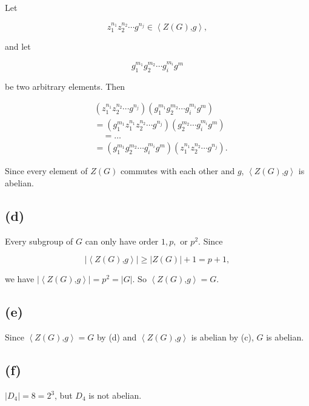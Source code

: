 Let

\[z_{1}^{n_{1}}z_{2}^{n_{2}}\cdots g^{n_{j}} \in \left\langle {Z(G)\text{,}g} \right\rangle,\]

and let

\[g_{1}^{m_{1}}g_{2}^{m_{2}}\cdots g_{i}^{m_{i}}g^{m}\]

be two arbitrary elements. Then

\[\begin{matrix}
 & {\left( {z_{1}^{n_{1}}z_{2}^{n_{2}}\cdots g^{n_{j}}} \right)\left( {g_{1}^{m_{1}}g_{2}^{m_{2}}\cdots g_{i}^{m_{i}}g^{m}} \right)} \\
 & {= \left( {g_{1}^{m_{1}}z_{1}^{n_{1}}z_{2}^{n_{2}}\cdots g^{n_{j}}} \right)\left( {g_{2}^{m_{2}}\cdots g_{i}^{m_{i}}g^{m}} \right)} \\
 & {\quad = \ldots} \\
 & {= \left( {g_{1}^{m_{1}}g_{2}^{m_{2}}\cdots g_{i}^{m_{i}}g^{m}} \right)\left( {z_{1}^{n_{1}}z_{2}^{n_{2}}\cdots g^{n_{j}}} \right).}
\end{matrix}\]

Since every element of \(Z(G)\) commutes with each other and \(g\), \(\left\langle {Z(G)\text{,}g} \right\rangle\) is abelian.

\subsection{(d)}

Every subgroup of \(G\) can only have order \(1,p,\) or \(p^{2}\). Since

\[\left| \left\langle {Z(G)\text{,}g} \right\rangle \right| \geq \left| {Z(G)} \right| + 1 = p + 1,\]

we have \(\left| \left\langle {Z(G)\text{,}g} \right\rangle \right| = p^{2} = |G|\). So \(\left\langle {Z(G)\text{,}g} \right\rangle = G\).

\subsection{(e)}

Since \(\left\langle {Z(G)\text{,}g} \right\rangle = G\) by (d) and \(\left\langle {Z(G)\text{,}g} \right\rangle\) is abelian by (c), \(G\) is abelian.

\subsection{(f)}

\(\left| D_{4} \right| = 8 = 2^{3}\), but \(D_{4}\) is not abelian.

